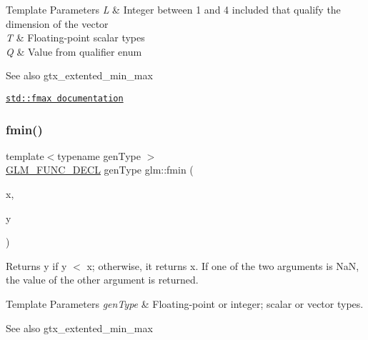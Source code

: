 \begin{DoxyTemplParams}{Template Parameters}
{\em L} & Integer between 1 and 4 included that qualify the dimension of the vector \\
\hline
{\em T} & Floating-\/point scalar types \\
\hline
{\em Q} & Value from qualifier enum\\
\hline
\end{DoxyTemplParams}
\begin{DoxySeeAlso}{See also}
gtx\+\_\+extented\+\_\+min\+\_\+max 

\href{http://en.cppreference.com/w/cpp/numeric/math/fmax}{\tt std\+::fmax documentation} 
\end{DoxySeeAlso}
\mbox{\label{group__gtx__extended__min__max_gaa3200559611ac5b9b9ae7283547916a7}} 
\subsubsection{\texorpdfstring{fmin()}{fmin()}\hspace{0.1cm}{\footnotesize\ttfamily [1/3]}}
{\footnotesize\ttfamily template$<$typename gen\+Type $>$ \\
\mbox{\hyperlink{setup_8hpp_ab2d052de21a70539923e9bcbf6e83a51}{G\+L\+M\+\_\+\+F\+U\+N\+C\+\_\+\+D\+E\+CL}} gen\+Type glm\+::fmin (\begin{DoxyParamCaption}\item[{gen\+Type}]{x,  }\item[{gen\+Type}]{y }\end{DoxyParamCaption})}

Returns y if y $<$ x; otherwise, it returns x. If one of the two arguments is NaN, the value of the other argument is returned.


\begin{DoxyTemplParams}{Template Parameters}
{\em gen\+Type} & Floating-\/point or integer; scalar or vector types.\\
\hline
\end{DoxyTemplParams}
\begin{DoxySeeAlso}{See also}
gtx\+\_\+extented\+\_\+min\+\_\+max 
\end{DoxySeeAlso}
\mbox{\label{group__gtx__extended__min__max_gae989203363cff9eab5093630df4fe071}} 

